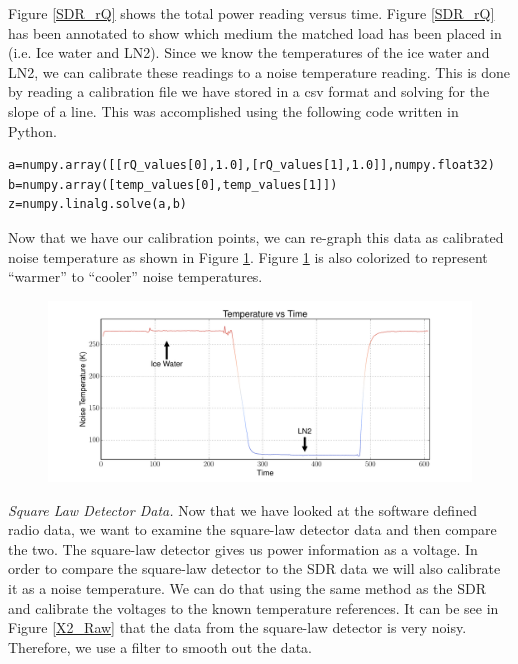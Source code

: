 Figure \ref{SDR_rQ} shows the total power reading versus time.  Figure \ref{SDR_rQ} has been annotated to show which medium the matched load has been placed in (i.e. Ice water and LN2).  Since we know the temperatures of the ice water and LN2, we can calibrate these readings to a noise temperature reading.  This is done by reading a calibration file we have stored in a csv format and solving for the slope of a line.  This was accomplished using the following code written in Python.

\lstset{language=Python}
\begin{lstlisting}[frame=single,keywordstyle=\color{blue}]
a=numpy.array([[rQ_values[0],1.0],[rQ_values[1],1.0]],numpy.float32)
b=numpy.array([temp_values[0],temp_values[1]])
z=numpy.linalg.solve(a,b)
\end{lstlisting}

Now that we have our calibration points, we can re-graph this data as calibrated noise temperature as shown in Figure \ref{SDR_Calibrated}.  Figure \ref{SDR_Calibrated} is also colorized to represent ``warmer'' to ``cooler'' noise temperatures.

\begin{figure}[h!tb] \centering

\includegraphics[width=\textwidth]{Experiments/Exp1/sdr_calibrated_color.pdf}

\label{SDR_Calibrated}
\end{figure}

\emph{Square Law Detector Data.}  Now that we have looked at the software defined radio data, we want to examine the square-law detector data and then compare the two.  The square-law detector gives us power information as a voltage.  In order to compare the square-law detector to the SDR data we will also calibrate it as a noise temperature.  We can do that using the same method as the SDR and calibrate the voltages to the known temperature references.  It can be see in Figure \ref{X2_Raw} that the data from the square-law detector is very noisy.  Therefore, we use a filter to smooth out the data.

